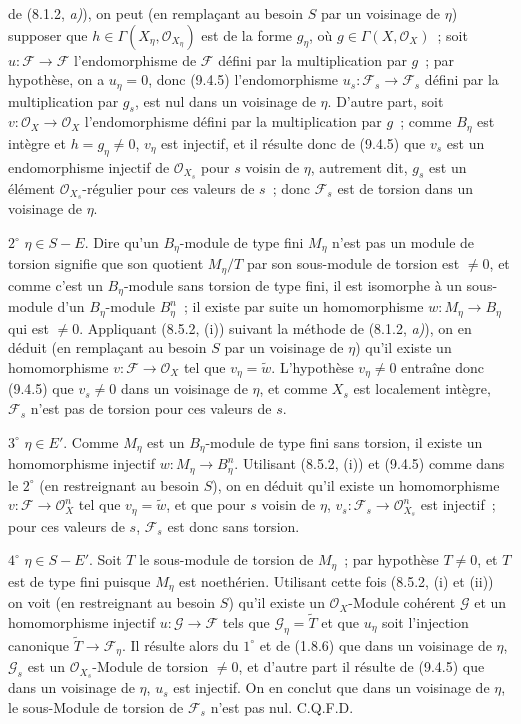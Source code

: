 
de (8.1.2, \emph{a)}), on peut (en remplaçant au besoin $S$ par un voisinage
de $\eta$) supposer que $h\in\Gamma(X_\eta,\mathcal O_{X_\eta})$ est de la
forme $g_\eta$, où $g\in\Gamma(X,\mathcal O_X)$~; soit
$u:\mathcal F\to\mathcal F$ l'endomorphisme de $\mathcal F$ défini par la
multiplication par $g$~; par hypothèse, on a $u_\eta=0$, donc (9.4.5)
l'endomorphisme $u_s:\mathcal F_s\to\mathcal F_s$ défini par la multiplication
par $g_s$, est nul dans un voisinage de $\eta$. D'autre part, soit
$v:\mathcal O_X\to\mathcal O_X$ l'endomorphisme défini par la multiplication
par $g$~; comme $B_\eta$ est intègre et $h=g_\eta\neq0$, $v_\eta$ est injectif,
et il résulte donc de (9.4.5) que $v_s$ est un endomorphisme injectif de
$\mathcal O_{X_s}$ pour $s$ voisin de $\eta$, autrement dit, $g_s$ est un
élément $\mathcal O_{X_s}$-régulier pour ces valeurs de $s$~; donc
$\mathcal F_s$ est de torsion dans un voisinage de $\eta$.

$2^\circ$ $\eta\in S-E$. Dire qu'un $B_\eta$-module de type fini $M_\eta$
n'est pas un module de torsion signifie que son quotient $M_\eta/T$ par son
sous-module de torsion est $\neq0$, et comme c'est un $B_\eta$-module sans
torsion de type fini, il est isomorphe à un sous-module d'un $B_\eta$-module
$B_\eta^n$~; il existe par suite un homomorphisme
$w:M_\eta\to B_\eta$ qui est $\neq0$. Appliquant (8.5.2, (i)) suivant la
méthode de (8.1.2, \emph{a)}), on en déduit (en remplaçant au besoin $S$ par un
voisinage de $\eta$) qu'il existe un homomorphisme
$v:\mathcal F\to\mathcal O_X$ tel que $v_\eta=\widetilde w$. L'hypothèse
$v_\eta\neq0$ entraîne donc (9.4.5) que $v_s\neq0$ dans un voisinage de
$\eta$, et comme $X_s$ est localement intègre, $\mathcal F_s$ n'est pas de
torsion pour ces valeurs de $s$.

$3^\circ$ $\eta\in E'$. Comme $M_\eta$ est un $B_\eta$-module de type fini
sans torsion, il existe un homomorphisme injectif
$w:M_\eta\to B_\eta^n$. Utilisant (8.5.2, (i)) et (9.4.5) comme dans le
$2^\circ$ (en restreignant au besoin $S$), on en déduit qu'il existe un
homomorphisme $v:\mathcal F\to\mathcal O_X^n$ tel que $v_\eta=\widetilde w$,
et que pour $s$ voisin de $\eta$,
$v_s:\mathcal F_s\to\mathcal O_{X_s}^n$ est injectif~; pour ces valeurs de
$s$, $\mathcal F_s$ est donc sans torsion.

$4^\circ$ $\eta\in S-E'$. Soit $T$ le sous-module de torsion de $M_\eta$~;
par hypothèse $T\neq0$, et $T$ est de type fini puisque $M_\eta$ est
noethérien. Utilisant cette fois (8.5.2, (i) et (ii)) on voit (en restreignant
au besoin $S$) qu'il existe un $\mathcal O_X$-Module cohérent $\mathcal G$ et
un homomorphisme injectif $u:\mathcal G\to\mathcal F$ tels que
$\mathcal G_\eta=\widetilde T$ et que $u_\eta$ soit l'injection canonique
$\widetilde T\to\mathcal F_\eta$. Il résulte alors du $1^\circ$ et de (1.8.6)
que dans un voisinage de $\eta$, $\mathcal G_s$ est un
$\mathcal O_{X_s}$-Module de torsion $\neq0$, et d'autre part il résulte de
(9.4.5) que dans un voisinage de $\eta$, $u_s$ est injectif. On en conclut que
dans un voisinage de $\eta$, le sous-Module de torsion de $\mathcal F_s$ n'est
pas nul. C.Q.F.D.

